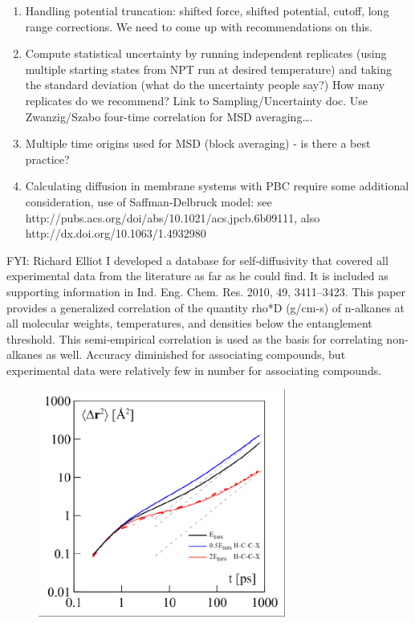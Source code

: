 \documentclass[9pt]{livecoms}
\begin{document}
\begin{enumerate}
	\item Handling potential truncation: shifted force, shifted potential, cutoff, long range corrections. We need to come up with recommendations on this.
	\item Compute statistical uncertainty by running independent replicates (using multiple starting states from NPT run at desired temperature) and taking the standard deviation (what do the uncertainty people say?) How many replicates do we recommend? Link to Sampling/Uncertainty doc. Use Zwanzig/Szabo four-time correlation for MSD averaging….
	\item Multiple time origins used for MSD (block averaging) - is there a best practice?
	\item Calculating diffusion in membrane systems with PBC require some additional consideration, use of Saffman-Delbruck model: see http://pubs.acs.org/doi/abs/10.1021/acs.jpcb.6b09111, also http://dx.doi.org/10.1063/1.4932980
\end{enumerate}

FYI: Richard Elliot I developed a database for self-diffusivity that covered all experimental data from the literature as far as he could find. It is included as supporting information in Ind. Eng. Chem. Res. 2010, 49, 3411–3423. This paper provides a generalized correlation of the quantity rho*D (g/cm-s) of n-alkanes at all molecular weights, temperatures, and densities below the entanglement threshold. This semi-empirical correlation is used as the basis for correlating non-alkanes as well. Accuracy diminished for associating compounds, but experimental data were relatively few in number for associating compounds.

\begin{figure}[htb!]
	\centering
	\includegraphics[width=3.2in]{figures/KondratyukFig2.png}
	\caption{}
	\label{fig:KondratyukFig2}
\end{figure}
\end{document}
